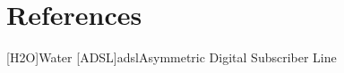 \chapter{References}

\footnotesize
\SingleSpacing

\begin{multicols}{2}
\begin{acronym}[AAAAAA]

	[H2O]{Water}
	[ADSL]{adsl}{Asymmetric Digital Subscriber Line}


\end{acronym}
\end{multicols}

